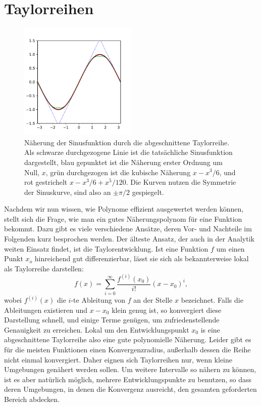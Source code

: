 \section{Taylorreihen}

\begin{figure}
  \centering
  \includegraphics[width=0.5\textwidth]{plots/sinus}
  \caption{Näherung der Sinusfunktion durch die abgeschnittene
    Taylorreihe. Als schwarze durchgezogene Linie ist die tatsächliche
    Sinusfunktion dargestellt, blau gepunktet ist die Näherung erster
    Ordnung um Null, $x$, grün durchgezogen ist die kubische Näherung
    $x - x^3/6$, und rot gestrichelt $x-x^3/6 + x^5/120$. Die Kurven
    nutzen die Symmetrie der Sinuskurve, sind also an $\pm\pi/2$
    gespiegelt.}
  \label{fig:sinus}
\end{figure}

Nachdem wir nun wissen, wie Polynome effizient ausgewertet werden
können, stellt sich die Frage, wie man ein gutes Näherungspolynom für
eine Funktion bekommt. Dazu gibt es viele verschiedene Ansätze, deren
Vor- und Nachteile im Folgenden kurz besprochen werden. Der älteste
Ansatz, der auch in der Analytik weiten Einsatz findet, ist die
Taylorentwicklung.  Ist eine Funktion $f$ um einen Punkt $x_o$
hinreichend gut differenzierbar, lässt sie sich als bekannterweise
lokal als Taylorreihe darstellen:
\begin{equation}
  f(x) = \sum_{i=0}^\infty \frac{f^{(i)}(x_0)}{i!} (x-x_0)^i,
  \label{eq:taylor}
\end{equation}
wobei $f^{(i)}(x)$ die $i$-te Ableitung von $f$ an der Stelle $x$
bezeichnet.  Falls die Ableitungen existieren und $x-x_0$ klein genug
ist, so konvergiert diese Darstellung schnell, und einige Terme
genügen, um zufriedenstellende Genauigkeit zu erreichen. Lokal um den
Entwicklungspunkt $x_0$ is eine abgeschnittene Taylorreihe also eine
gute polynomielle Näherung. Leider gibt es für die meisten Funktionen
einen Konvergenzradius, außerhalb dessen die Reihe nicht einmal
konvergiert. Daher eignen sich Taylorreihen nur, wenn kleine 
Umgebungen genähert werden sollen. Um weitere Intervalle so nähern zu
können, ist es aber natürlich möglich, mehrere Entwicklungspunkte zu
benutzen, so dass deren Umgebungen, in denen die Konvergenz ausreicht,
den gesamten geforderten Bereich abdecken.

